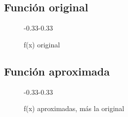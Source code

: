 \documentclass{article}[12pt,a4paper]
\begin{document}
\subsection{Función original}

\begin{figure}[H]
  \begin{adjustwidth}{-0.33\linewidth}{-0.33\linewidth}
    \resizebox{\linewidth}{!}{}
  \end{adjustwidth}
  \caption{f(x) original}
  \label{fig:original}
\end{figure}

\subsection{Función aproximada}

\begin{figure}[H]
  \begin{adjustwidth}{-0.33\linewidth}{-0.33\linewidth}
    \resizebox{\linewidth}{!}{}
  \end{adjustwidth}
  \caption{f(x) aproximadas, más la original}
  \label{fig:aprox}
\end{figure}
\end{document}
